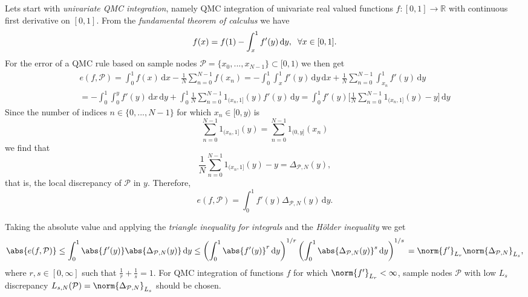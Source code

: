 Lets start with \textit{univariate QMC integration}, namely QMC integration of univariate real valued functions $f:[0,1] \longrightarrow \mathbb{R}$ with continuous first derivative on $[0,1]$. From the \textit{fundamental theorem of calculus} we have
\begin{equation*}
    f(x) = f(1) - \int_x^1 f'(y)\,\mathrm{d}y, \hspace{2mm} \forall x \in [0,1].
\end{equation*}
For the error of a QMC rule based on sample nodes $\mathcal{P}=\{ x_0,...,x_{N-1} \} \subset [0,1)$ we then get
\begin{multline*}
    e(f,\mathcal{P}) = \int_0^1 f(x)\,\mathrm{d}x - \frac{1}{N} \sum_{n=0}^{N-1} f(x_n) = -\int_0^1 \int_x^1 f'(y)\,\mathrm{d}y \,\mathrm{d}x + \frac{1}{N} \sum_{n=0}^{N-1} \int_{x_n}^1 f'(y) \,\mathrm{d}y \\
    = -\int_0^1 \int_0^y f'(y)\,\mathrm{d}x \,\mathrm{d}y + \int_0^1 \frac{1}{N} \sum_{n=0}^{N-1} 1_{(x_n,1]}(y) f'(y) \,\mathrm{d}y = \int_0^1 f'(y) \Bigg[\frac{1}{N} \sum_{n=0}^{N-1} 1_{(x_n,1]}(y) - y\Bigg] \,\mathrm{d}y
\end{multline*}
Since the number of indices $n\in \{ 0,...,N-1 \}$ for which $x_n \in [0,y)$ is
\begin{equation*}
    \sum_{n=0}^{N-1} 1_{(x_n,1]}(y) = \sum_{n=0}^{N-1} 1_{(0,y]}(x_n)
\end{equation*}
we find that
\begin{equation*}
    \frac{1}{N} \sum_{n=0}^{N-1} 1_{(x_n,1]}(y) - y = \Delta_{\mathcal{P},N}(y),
\end{equation*}
that is, the local discrepancy of $\mathcal{P}$ in $y$. Therefore,
\begin{equation*}
    e(f,\mathcal{P}) = \int_0^1 f'(y)\Delta_{\mathcal{P},N}(y)\,\mathrm{d}y.
\end{equation*}

Taking the absolute value and applying the \textit{triangle inequality for integrals} and the \textit{Hölder inequality} we get
\begin{equation*}
    \abs{e(f,\mathcal{P})} \leq \int_0^1 \abs{f'(y)} \abs{\Delta_{\mathcal{P},N}(y)} \,\mathrm{d}y \leq \left( \int_0^1 \abs{f'(y)}^r \,\mathrm{d}y \right)^{1/r} \left(  \int_0^1 \abs{\Delta_{\mathcal{P},N}(y)}^s \,\mathrm{d}y \right)^{1/s} \\
    = \norm{f'}_{L_r} \norm{\Delta_{\mathcal{P},N}}_{L_s},
\end{equation*}
where $r,s \in [0,\infty]$ such that $\frac{1}{r} + \frac{1}{s} = 1$. For QMC integration of functions $f$ for which $\norm{f'}_{L_r} < \infty$, sample nodes $\mathcal{P}$ with low $L_s$ discrepancy $L_{s,N}(\mathcal{P}) = \norm{\Delta_{\mathcal{P},N}}_{L_s}$ should be chosen.\\

